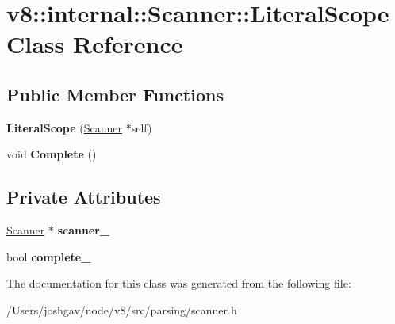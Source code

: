 \hypertarget{classv8_1_1internal_1_1_scanner_1_1_literal_scope}{}\section{v8\+:\+:internal\+:\+:Scanner\+:\+:Literal\+Scope Class Reference}
\label{classv8_1_1internal_1_1_scanner_1_1_literal_scope}
\subsection*{Public Member Functions}
\begin{DoxyCompactItemize}
\item 
{\bfseries Literal\+Scope} (\hyperlink{classv8_1_1internal_1_1_scanner}{Scanner} $\ast$self)\hypertarget{classv8_1_1internal_1_1_scanner_1_1_literal_scope_a41aa10c53be0e4c538f7e39128ba93bb}{}\label{classv8_1_1internal_1_1_scanner_1_1_literal_scope_a41aa10c53be0e4c538f7e39128ba93bb}

\item 
void {\bfseries Complete} ()\hypertarget{classv8_1_1internal_1_1_scanner_1_1_literal_scope_a32e54a0a93bc5d28e060494e8006c858}{}\label{classv8_1_1internal_1_1_scanner_1_1_literal_scope_a32e54a0a93bc5d28e060494e8006c858}

\end{DoxyCompactItemize}
\subsection*{Private Attributes}
\begin{DoxyCompactItemize}
\item 
\hyperlink{classv8_1_1internal_1_1_scanner}{Scanner} $\ast$ {\bfseries scanner\+\_\+}\hypertarget{classv8_1_1internal_1_1_scanner_1_1_literal_scope_ad38fe4b272a1d39ac1e54c9be7470e7a}{}\label{classv8_1_1internal_1_1_scanner_1_1_literal_scope_ad38fe4b272a1d39ac1e54c9be7470e7a}

\item 
bool {\bfseries complete\+\_\+}\hypertarget{classv8_1_1internal_1_1_scanner_1_1_literal_scope_a345a24632d4b811bd2dcdc8672eacec4}{}\label{classv8_1_1internal_1_1_scanner_1_1_literal_scope_a345a24632d4b811bd2dcdc8672eacec4}

\end{DoxyCompactItemize}


The documentation for this class was generated from the following file\+:\begin{DoxyCompactItemize}
\item 
/\+Users/joshgav/node/v8/src/parsing/scanner.\+h\end{DoxyCompactItemize}
